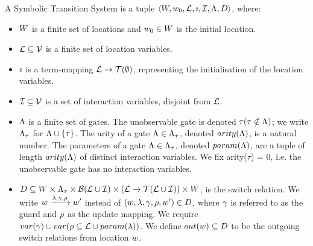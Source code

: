 \begin{definition}
A Symbolic Transition System is a tuple $\langle W,w_0,\mathcal{L},\imath,\mathcal{I},\Lambda,D\rangle$, where:
\begin{itemize}
\item $W$ is a finite set of locations and $w_0 \in W$ is the initial location.
\item $\mathcal{L} \subseteq \mathcal{V}$ is a finite set of location variables.
\item $\imath$ is a term-mapping $\mathcal{L} \rightarrow \mathcal{T}(\emptyset)$, representing the initialisation of the location variables.
\item $\mathcal{I} \subseteq \mathcal{V}$ is a set of interaction variables, disjoint from $\mathcal{L}$.
\item $\Lambda$ is a finite set of gates. The unobservable gate is denoted $\tau (\tau \notin \Lambda)$; we write $\Lambda_\tau$ for $\Lambda \cup \{\tau\}$. The arity of a gate $\Lambda\in\Lambda_\tau$, denoted $arity(\Lambda)$, is a natural number. The parameters of a gate $\Lambda\in\Lambda_\tau$, denoted $param(\Lambda)$, are a tuple of length $arity(\Lambda)$ of distinct interaction variables. We fix arity($\tau$) = 0, i.e. the unobservable gate has no interaction variables.
\item $D \subseteq W \times \Lambda_\tau \times \mathcal{B}(\mathcal{L} \cup \mathcal{I}) \times (\mathcal{L} \rightarrow \mathcal{T}(\mathcal{L} \cup \mathcal{I})) \times W$, is the switch relation. We write $w\xrightarrow{\lambda,\gamma,\rho}w'$ instead of $(w,\lambda,\gamma,\rho,w')\in D$, where $\gamma$ is referred to as the guard and $\rho$ as the update mapping. We require $var(\gamma) \cup var(\rho \subseteq \mathcal{L} \cup param(\lambda))$. We define $out(w) \subseteq D$ to be the outgoing switch relations from location $w$.
\end{itemize}
\end{definition}

